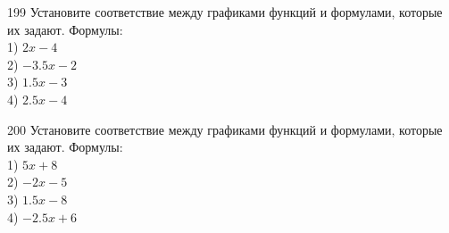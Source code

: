 \documentclass[4apaper]{article}
\begin{document}
\begin{taskBN}{199}
Установите соответствие между графиками функций и формулами, которые их задают. Формулы: \\1) $2x-4$\\2) $-3.5x-2$\\3) $1.5x-3$\\4) $2.5x-4$
\end{taskBN}

\begin{taskBN}{200}
Установите соответствие между графиками функций и формулами, которые их задают. Формулы: \\1) $5x+8$\\2) $-2x-5$\\3) $1.5x-8$\\4) $-2.5x+6$
\end{taskBN}

\newpage
 
\end{document}
